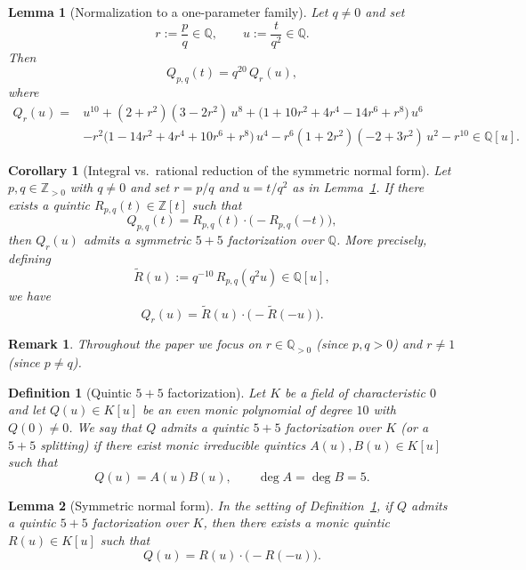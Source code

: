 \documentclass[10pt,a4paper]{amsart}
\newtheorem{lemma}{Lemma}
\newtheorem{corollary}{Corollary}
\newtheorem{remark}{Remark}
\newtheorem{definition}{Definition}
\begin{document}
\begin{lemma}[Normalization to a one-parameter family]\label{lem:normalize}
Let $q\neq 0$ and set
\[
r:=\frac{p}{q}\in\mathbb{Q},\qquad u:=\frac{t}{q^{2}}\in\mathbb{Q}.
\]
Then
\begin{equation}\label{eq:normalize}
Q_{p,q}(t)=q^{20}\,Q_r(u),
\end{equation}
where
\begin{equation}\label{eq:Qr}
\begin{aligned}
Q_r(u)
={}& u^{10} + (2+r^2)(3-2r^2)\,u^{8} + \bigl(1+10r^2+4r^4-14r^6+r^8\bigr)\,u^{6}\\
& - r^2\bigl(1-14r^2+4r^4+10r^6+r^8\bigr)\,u^{4}
 - r^6(1+2r^2)(-2+3r^2)\,u^{2}
 - r^{10}\in\mathbb{Q}[u].
\end{aligned}
\end{equation}
\end{lemma}

\begin{corollary}[Integral vs.\ rational reduction of the symmetric normal form]\label{cor:int_to_rat}
Let $p,q\in\mathbb{Z}_{>0}$ with $q\neq 0$ and set $r=p/q$ and $u=t/q^2$ as in Lemma~\ref{lem:normalize}.
If there exists a quintic $R_{p,q}(t)\in\mathbb{Z}[t]$ such that
\[
Q_{p,q}(t)=R_{p,q}(t)\cdot\bigl(-R_{p,q}(-t)\bigr),
\]
then $Q_r(u)$ admits a symmetric $5+5$ factorization over $\mathbb{Q}$.
More precisely, defining
\[
\widetilde{R}(u):=q^{-10}\,R_{p,q}(q^{2}u)\in\mathbb{Q}[u],
\]
we have
\[
Q_r(u)=\widetilde{R}(u)\cdot\bigl(-\widetilde{R}(-u)\bigr).
\]
\end{corollary}

\begin{remark}\label{rem:domain}
Throughout the paper we focus on $r\in\mathbb{Q}_{>0}$ (since $p,q>0$) and $r\neq 1$ (since $p\neq q$).
\end{remark}

\begin{definition}[Quintic $5+5$ factorization]\label{def:55}
Let $K$ be a field of characteristic $0$ and let $Q(u)\in K[u]$ be an even monic polynomial of degree $10$ with $Q(0)\neq 0$.
We say that $Q$ admits a \emph{quintic $5+5$ factorization over $K$} (or a \emph{$5+5$ splitting}) if there exist monic \emph{irreducible} quintics $A(u),B(u)\in K[u]$ such that
\[
Q(u)=A(u)B(u),\qquad \deg A=\deg B=5.
\]
\end{definition}

\begin{lemma}[Symmetric normal form]\label{lem:sym_normal}
In the setting of Definition~\ref{def:55}, if $Q$ admits a quintic $5+5$ factorization over $K$, then there exists a monic quintic $R(u)\in K[u]$ such that
\[
Q(u)=R(u)\cdot \bigl(-R(-u)\bigr).
\]
\end{lemma}
\end{document}
